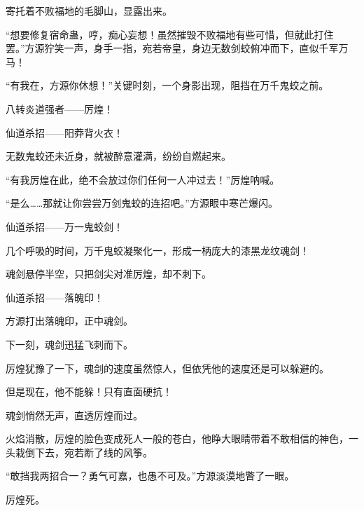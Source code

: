 \begin{this_body}
寄托着不败福地的毛脚山，显露出来。

“想要修复宿命蛊，哼，痴心妄想！虽然摧毁不败福地有些可惜，但就此打住罢。”方源狞笑一声，身手一指，宛若帝皇，身边无数剑蛟俯冲而下，直似千军万马！

“有我在，方源你休想！”关键时刻，一个身影出现，阻挡在万千鬼蛟之前。

八转炎道强者——厉煌！

仙道杀招——阳莽背火衣！

无数鬼蛟还未近身，就被醉意灌满，纷纷自燃起来。

“有我厉煌在此，绝不会放过你们任何一人冲过去！”厉煌呐喊。

“是么……那就让你尝尝万剑鬼蛟的连招吧。”方源眼中寒芒爆闪。

仙道杀招——万一鬼蛟剑！

几个呼吸的时间，万千鬼蛟凝聚化一，形成一柄庞大的漆黑龙纹魂剑！

魂剑悬停半空，只把剑尖对准厉煌，却不刺下。

仙道杀招——落魄印！

方源打出落魄印，正中魂剑。

下一刻，魂剑迅猛飞刺而下。

厉煌犹豫了一下，魂剑的速度虽然惊人，但依凭他的速度还是可以躲避的。

但是现在，他不能躲！只有直面硬抗！

魂剑悄然无声，直透厉煌而过。

火焰消散，厉煌的脸色变成死人一般的苍白，他睁大眼睛带着不敢相信的神色，一头栽倒下去，宛若断了线的风筝。

“敢挡我两招合一？勇气可嘉，也愚不可及。”方源淡漠地瞥了一眼。

厉煌死。

\end{this_body}

